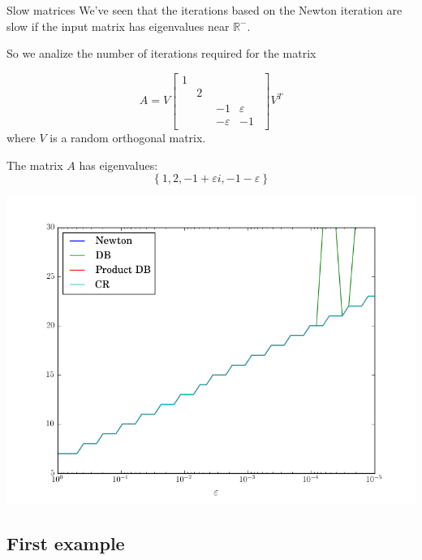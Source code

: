 \documentclass{beamer}
\theoremstyle{plain}
\theoremstyle{definition}
\theoremstyle{remark}
\newcommand{\set}[1]{\left\{#1\right\}}
\newcommand{\bra}[1]{\left[#1\right]}
\begin{document}
\begin{frame}{Slow matrices}
  We've seen that the iterations based on the Newton iteration are
  slow if the input matrix has eigenvalues near $\mathbb{R}^-$.
  \vfill

  So we analize the number of iterations required for the matrix
  
  \[ A = V \bra{ \begin{matrix}
        1 & & \\ 
        & 2 & \\ 
        & & \begin{matrix}
          -1 & \varepsilon \\
          - \varepsilon & -1
        \end{matrix}
      \end{matrix}
    } V^{T}
  \]
  where $V$ is a random orthogonal matrix.

  The matrix $A$ has eigenvalues:
  \[ \set{1,2,-1+\varepsilon i,-1 -\varepsilon} \]
\end{frame}

\begin{frame}
  \includegraphics[width=\textwidth,height=\textheight]{"eig_orto"}
\end{frame}


\subsection{First example}
\end{document}

